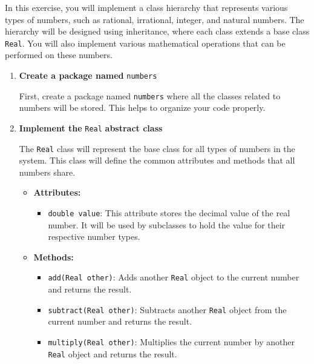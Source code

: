 In this exercise, you will implement a class hierarchy that represents various types of numbers, such as rational, irrational, integer, and natural numbers. The hierarchy will be designed using inheritance, where each class extends a base class \texttt{Real}. You will also implement various mathematical operations that can be performed on these numbers.

\begin{enumerate}

    \item \textbf{Create a package named} \texttt{numbers}

    First, create a package named \texttt{numbers} where all the classes related to numbers will be stored. This helps to organize your code properly.

    \item \textbf{Implement the} \texttt{Real} \textbf{abstract class}

    The \texttt{Real} class will represent the base class for all types of numbers in the system. This class will define the common attributes and methods that all numbers share.

        \begin{itemize}

            \item \textbf{Attributes:}

                \begin{itemize}

                    \item \texttt{double value}: This attribute stores the decimal value of the real number. It will be used by subclasses to hold the value for their respective number types.

                \end{itemize}

            \item \textbf{Methods:}

                \begin{itemize}

                    \item \texttt{add(Real other)}: Adds another \texttt{Real} object to the current number and returns the result.

                    \item \texttt{subtract(Real other)}: Subtracts another \texttt{Real} object from the current number and returns the result.

                    \item \texttt{multiply(Real other)}: Multiplies the current number by another \texttt{Real} object and returns the result.


\end{itemize}
\end{itemize}
\end{enumerate}

